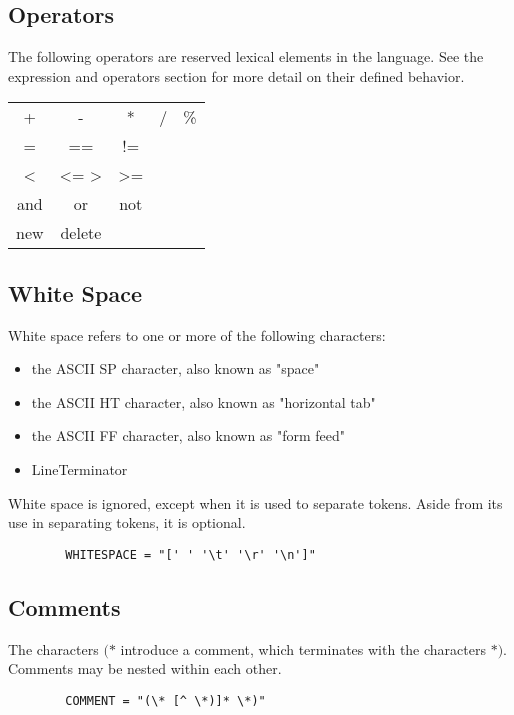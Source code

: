 \begin{homeworkProblem}
	\subsection{Operators}
	The following operators are reserved lexical elements in the language. See the expression and operators section for more detail on their defined behavior.
	\begin{center}
		\begin{tabular}{ccccc}
			+ & - & * & / & \% \\
			= & == & != & & \\
			\textless & \textless= \textgreater & \textgreater= & & \\
			and & or & not & & \\
			new & delete & & & \\
		\end{tabular}
	\end{center}
	
	\subsection{White Space}
	White space refers to one or more of the following characters:
	\begin{itemize}
		\item the ASCII SP character, also known as "space"
		\item the ASCII HT character, also known as "horizontal tab"
		\item the ASCII FF character, also known as "form feed"
		\item LineTerminator
	\end{itemize}
	White space is ignored, except when it is used to separate tokens. Aside from its use in separating tokens, it is optional.
	\begin{verbatim}
		WHITESPACE = "[' ' '\t' '\r' '\n']"
	\end{verbatim}
	
	\subsection{Comments}
	The characters $(*$ introduce a comment, which terminates with the characters $*)$. Comments may be nested within each other.
	\begin{verbatim}
		COMMENT = "(\* [^ \*)]* \*)"
	\end{verbatim}
	
\end{homeworkProblem}

